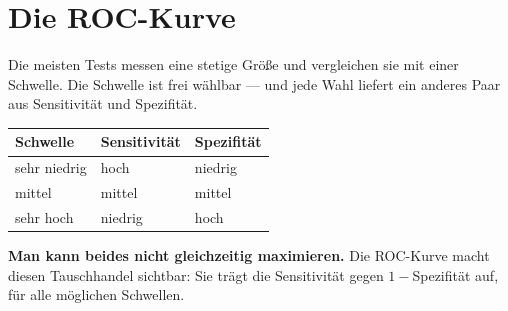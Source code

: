 \section{Die ROC-Kurve}

\begin{merksatz}
Die meisten Tests messen eine stetige Größe und vergleichen sie mit einer Schwelle. Die Schwelle ist frei wählbar --- und jede Wahl liefert ein anderes Paar aus Sensitivität und Spezifität.

\begin{center}
\renewcommand{\arraystretch}{1.5}
\begin{tabular}{@{}P{2.6cm}P{2.6cm}P{2.8cm}@{}}
\toprule
\textbf{Schwelle} & \textbf{Sensitivität} & \textbf{Spezifität}\\
\midrule
sehr niedrig & \textcolor{gruen}{hoch} & \textcolor{akzent}{niedrig}\\
mittel & mittel & mittel\\
sehr hoch & \textcolor{akzent}{niedrig} & \textcolor{gruen}{hoch}\\
\bottomrule
\end{tabular}
\end{center}

\begin{center}
\begin{minipage}{0.9\textwidth}
\textbf{Man kann beides nicht gleichzeitig maximieren.} Die ROC-Kurve macht diesen Tauschhandel sichtbar: Sie trägt die Sensitivität gegen $1-$Spezifität auf, für alle möglichen Schwellen.
\end{minipage}
\end{center}

\begin{center}
\end{center}
\end{merksatz}

